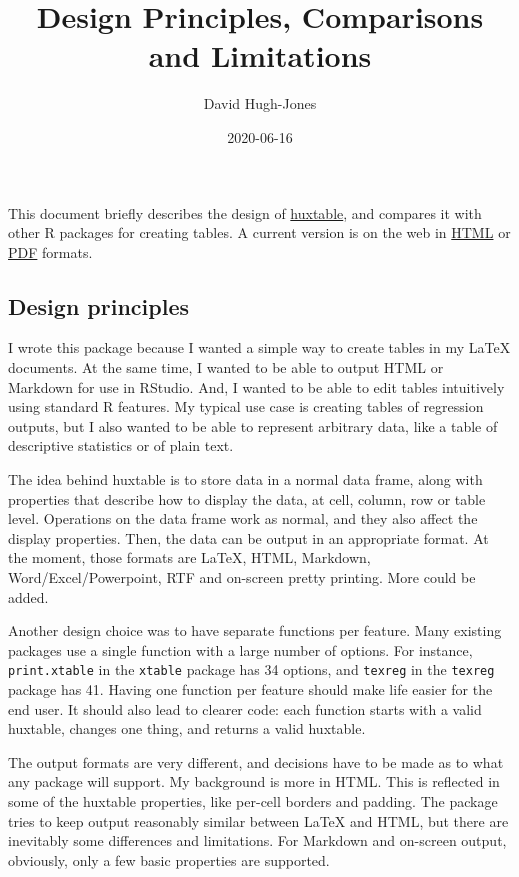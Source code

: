 \documentclass[]{article}
\title{Design Principles, Comparisons and Limitations}
\author{David Hugh-Jones}
\date{2020-06-16}
\begin{document}
\maketitle

This document briefly describes the design of
\href{https://hughjonesd.github.io/huxtable}{huxtable}, and compares it
with other R packages for creating tables. A current version is on the
web in
\href{http://hughjonesd.github.io/huxtable/design-principles.html}{HTML}
or
\href{http://hughjonesd.github.io/huxtable/design-principles.pdf}{PDF}
formats.

\hypertarget{design-principles}{%
\subsection{Design principles}\label{design-principles}}

I wrote this package because I wanted a simple way to create tables in
my LaTeX documents. At the same time, I wanted to be able to output HTML
or Markdown for use in RStudio. And, I wanted to be able to edit tables
intuitively using standard R features. My typical use case is creating
tables of regression outputs, but I also wanted to be able to represent
arbitrary data, like a table of descriptive statistics or of plain text.

The idea behind huxtable is to store data in a normal data frame, along
with properties that describe how to display the data, at cell, column,
row or table level. Operations on the data frame work as normal, and
they also affect the display properties. Then, the data can be output in
an appropriate format. At the moment, those formats are LaTeX, HTML,
Markdown, Word/Excel/Powerpoint, RTF and on-screen pretty printing. More
could be added.

Another design choice was to have separate functions per feature. Many
existing packages use a single function with a large number of options.
For instance, \texttt{print.xtable} in the \texttt{xtable} package has
34 options, and \texttt{texreg} in the \texttt{texreg} package has 41.
Having one function per feature should make life easier for the end
user. It should also lead to clearer code: each function starts with a
valid huxtable, changes one thing, and returns a valid huxtable.

The output formats are very different, and decisions have to be made as
to what any package will support. My background is more in HTML. This is
reflected in some of the huxtable properties, like per-cell borders and
padding. The package tries to keep output reasonably similar between
LaTeX and HTML, but there are inevitably some differences and
limitations. For Markdown and on-screen output, obviously, only a few
basic properties are supported.
\end{document}
